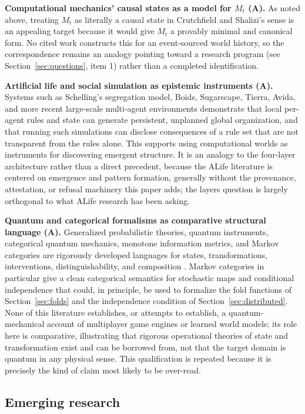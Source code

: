 \documentclass[11pt]{article}
\begin{document}
\textbf{Computational mechanics' causal states as a model for $M_t$ (A).} As noted above, treating $M_t$ as literally a causal state in Crutchfield and Shalizi's sense is an appealing target because it would give $M_t$ a provably minimal and canonical form. No cited work constructs this for an event-sourced world history, so the correspondence remains an analogy pointing toward a research program (see Section~\ref{sec:questions}, item 1) rather than a completed identification.

\textbf{Artificial life and social simulation as epistemic instruments (A).} Systems such as Schelling's segregation model, Boids, Sugarscape, Tierra, Avida, and more recent large-scale multi-agent environments demonstrate that local per-agent rules and state can generate persistent, unplanned global organization, and that running such simulations can disclose consequences of a rule set that are not transparent from the rules alone. This supports using computational worlds as instruments for discovering emergent structure. It is an analogy to the four-layer architecture rather than a direct precedent, because the ALife literature is centered on emergence and pattern formation, generally without the provenance, attestation, or refusal machinery this paper adds; the layers question is largely orthogonal to what ALife research has been asking.

\textbf{Quantum and categorical formalisms as comparative structural language (A).} Generalized probabilistic theories, quantum instruments, categorical quantum mechanics, monotone information metrics, and Markov categories are rigorously developed languages for states, transformations, interventions, distinguishability, and composition \cite{barrett2007, coeckekissinger2017, fritz2020}. Markov categories in particular give a clean categorical semantics for stochastic maps and conditional independence that could, in principle, be used to formalize the fold functions of Section~\ref{sec:folds} and the independence condition of Section~\ref{sec:distributed}. None of this literature establishes, or attempts to establish, a quantum-mechanical account of multiplayer game engines or learned world models; its role here is comparative, illustrating that rigorous operational theories of state and transformation exist and can be borrowed from, not that the target domain is quantum in any physical sense. This qualification is repeated because it is precisely the kind of claim most likely to be over-read.

\subsection{Emerging research}
\label{sec:emerging}
\end{document}
